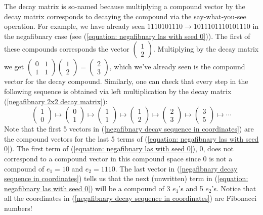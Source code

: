 \documentclass[reqno]{amsart}
\theoremstyle{definition}
\begin{document}
The decay matrix is so-named because multiplying a compound vector by the decay matrix corresponds to decaying the compound via the say-what-you-see operation. For example, we have already seen $1110101110\to 1011101110101110$ in the negafibnary case (see (\ref{equation: negafibnary las with seed 0})). The first of these compounds corresponds the vector 
$\begin{pmatrix}
    1\\ 2
\end{pmatrix}$. Multiplying by the decay matrix we get $\begin{pmatrix}
    0 & 1\\ 1 & 1
\end{pmatrix}
\begin{pmatrix}
    1\\ 2
\end{pmatrix}
=
\begin{pmatrix}
    2\\ 3
\end{pmatrix}$, which we've already seen is the compound vector for the decay compound. 
Similarly, one can check that every step in the following sequence is obtained via left multiplication by the decay matrix (\ref{negafibnary 2x2 decay matrix}):
\begin{equation}\label{negafibnary decay sequence in coordinates}
    \begin{pmatrix}
        1\\ 0
    \end{pmatrix}
    \mapsto
    \begin{pmatrix}
        0\\ 1
    \end{pmatrix}
    \mapsto
    \begin{pmatrix}
        1\\ 1
    \end{pmatrix}
    \mapsto
    \begin{pmatrix}
        1\\ 2
    \end{pmatrix}
    \mapsto
    \begin{pmatrix}
        2\\ 3
    \end{pmatrix}
    \mapsto
    \begin{pmatrix}
        3\\ 5
    \end{pmatrix}
    \mapsto
    \cdots
\end{equation}
Note that the first 5 vectors in (\ref{negafibnary decay sequence in coordinates}) are the compound vectors for the last 5 terms of (\ref{equation: negafibnary las with seed 0}). The first term of (\ref{equation: negafibnary las with seed 0}), 0, does not correspond to a compound vector in this compound space since 0 is not a compound of $e_1=10$ and $e_2=1110$. The last vector in (\ref{negafibnary decay sequence in coordinates}) tells us that the next (unwritten) term in (\ref{equation: negafibnary las with seed 0}) will be a compound of 3 $e_1$'s  and 5 $e_2$'s. Notice that all the coordinates in (\ref{negafibnary decay sequence in coordinates}) are Fibonacci numbers!
\end{document}

